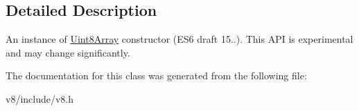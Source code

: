 \subsection{Detailed Description}
An instance of \hyperlink{classv8_1_1Uint8Array}{Uint8\-Array} constructor (E\-S6 draft 15..). This A\-P\-I is experimental and may change significantly. 

The documentation for this class was generated from the following file\-:\begin{DoxyCompactItemize}
\item 
v8/include/v8.\-h\end{DoxyCompactItemize}
